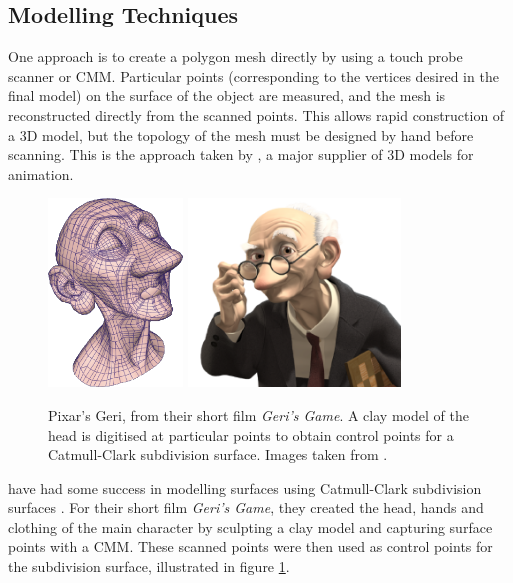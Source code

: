 \subsection{\label{sec:litreview:modeling:techniques}Modelling Techniques}

One approach is to create a polygon mesh directly by using a touch probe scanner or CMM. Particular points (corresponding to the vertices desired in the final model) on the surface of the object are measured, and the mesh is reconstructed directly from the scanned points. This allows rapid construction of a 3D model, but the topology of the mesh must be designed by hand before scanning. This is the approach taken by \citet{Viewpoint}, a major supplier of 3D models for animation.

\begin{figure}
\begin{center}
\includegraphics[height=5cm]{../images/geri_control}
\includegraphics[height=5cm]{../images/geri2}
\caption[Pixar's Geri]{\label{fig:geri}Pixar's Geri, from their short film {\it Geri's Game}. A clay model of the head is digitised at particular points to obtain control points for a Catmull-Clark subdivision surface. Images taken from \cite{DeRose98}.}
\end{center}
\end{figure}
\citet{Pixar} have had some success in modelling surfaces using Catmull-Clark subdivision surfaces \cite{DeRose98}. For their short film {\it Geri's Game}, they created the head, hands and clothing of the main character by sculpting a clay model and capturing surface points with a CMM. These scanned points were then used as control points for the subdivision surface, illustrated in figure \ref{fig:geri}.

